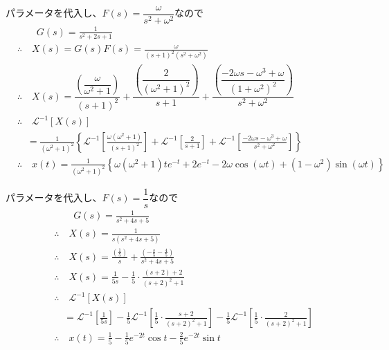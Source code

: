 \documentclass[a4paper,12pt]{article}
\begin{document}
\begin{tcolorbox}[title={2. (7) \(M=1,D=2,K=1,\)入力を\(f(t)=\sin \omega t\)として、応答\(x(t)\)を求めよ。}]
    パラメータを代入し、\(F(s) = \dfrac{\omega}{s^2 + \omega^2}\)なので
    \vspace{-2mm}
    \begin{align*}
        &\qquad G(s) = \frac{1}{s^2 + 2s + 1} \\
        &\therefore \quad X(s) = G(s) F(s) = \frac{\omega}{(s+1)^2(s^2 + \omega^2)} \\
        &\therefore \quad X(s) 
        = \dfrac{\left(\dfrac{\omega}{\omega^2 + 1}\right)}{(s+1)^2}
        + \dfrac{\left(\dfrac{2}{(\omega^2 + 1)^2}\right)}{s+1}
        + \dfrac{\left(\dfrac{-2 \omega s - \omega^3 + \omega}{(1+\omega^2)^2}\right)}{s^2+\omega^2} \\
        &\therefore \quad \mathcal{L}^{-1} \left[ X(s)\right]\\ 
        & \quad = \frac{1}{(\omega^2 + 1)^2} \left\{ \mathcal{L}^{-1} \left[\frac{\omega(\omega^2 + 1)}{(s+1)^2}\right]
        + \mathcal{L}^{-1} \left[\frac{2}{s+1}\right]
        + \mathcal{L}^{-1} \left[\frac{-2 \omega s-\omega ^3+\omega}{s^2+\omega^2}\right] 
        \right\}\\
        &\therefore \quad x(t) =\frac{1}{(\omega^2 + 1)^2}
        \left\{\omega (\omega^2+1)  t e^{-t}+ 2 e^{-t}
        - 2\omega \cos(\omega t) + (1 - \omega^2)  \sin(\omega t) 
        \right\}
    \end{align*}
\end{tcolorbox}

\begin{tcolorbox}[title={2. (8) \(M=1,D=4,K=5\)としてステップ入力を与えたときの応答\(x(t)\)を求めよ。}]
    パラメータを代入し、\(F(s) = \dfrac{1}{s}\)なので
    \vspace{-2mm}
  \begin{align*}
    &\qquad G(s) = \frac{1}{s^2 + 4s + 5} \\
    &\therefore\quad X(s) = \frac{1}{s(s^2 + 4s + 5)} \\
    &\therefore\quad X(s) = \frac{\left(\frac{1}{5}\right)}{s} 
    + \frac{\left(-\frac{s}{5}-\frac{4}{5}\right)}{s^2 + 4s + 5} \\
    &\therefore\quad X(s) = \frac{1}{5s} - \frac{1}{5} \cdot \frac{(s + 2) + 2}{(s + 2)^2 + 1} \\
    &\therefore \quad \mathcal{L}^{-1} \left[ X(s)\right] \\
    &\quad = \mathcal{L}^{-1} \left[\frac{1}{5s}\right] 
    - \frac{1}{5} \mathcal{L}^{-1} \left[\frac{1}{5} \cdot \frac{s + 2}{(s + 2)^2 + 1}\right]
    - \frac{1}{5} \mathcal{L}^{-1} \left[\frac{1}{5} \cdot \frac{2}{(s + 2)^2 + 1} \right] \\
    &\therefore\quad x(t) = \frac{1}{5} - \frac{1}{5} e^{-2t} \cos t - \frac{2}{5} e^{-2t} \sin t
\end{align*}
\end{tcolorbox}
\end{document}
